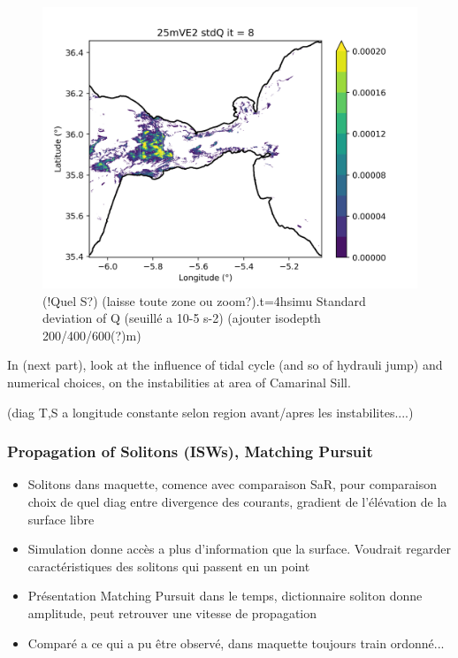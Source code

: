 \begin{figure}[!h]
 \includegraphics[width=\textwidth]{./GBR3D/stdQ_25mIES_it-8.png}
 \caption {(!Quel S?) (laisse toute zone ou zoom?).t=4hsimu Standard deviation of Q (seuillé a 10-5 s-2) (ajouter isodepth 200/400/600(?)m)}
  \label{fig3}
\end{figure}

In (next part), look at the influence of tidal cycle (and so of hydrauli jump) and numerical choices, on the instabilities at area of Camarinal Sill.

(diag T,S a longitude constante selon region avant/apres les instabilites....)




\subsubsection{Propagation of Solitons (ISWs), Matching Pursuit}

\begin{itemize}
\item Solitons dans maquette, comence avec comparaison SaR, pour comparaison choix de quel diag entre divergence  des courants, gradient de l'élévation de la surface libre
\item Simulation donne accès a plus d'information que la surface. Voudrait regarder caractéristiques des solitons qui passent en un point 
\item Présentation Matching Pursuit dans le temps, dictionnaire soliton donne amplitude, peut retrouver une vitesse de propagation
\item Comparé a ce qui a pu être observé, dans maquette toujours train ordonné...
\end{itemize}


